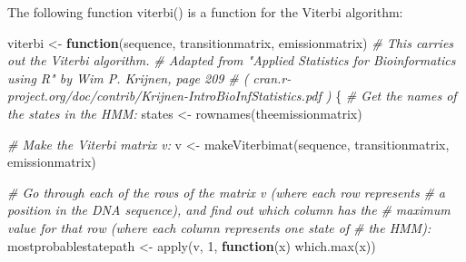 \documentclass[
]{book}
\newenvironment{Shaded}{\begin{snugshade}}{\end{snugshade}}
\newcommand{\CommentTok}[1]{\textcolor[rgb]{0.56,0.35,0.01}{\textit{#1}}}
\newcommand{\ControlFlowTok}[1]{\textcolor[rgb]{0.13,0.29,0.53}{\textbf{#1}}}
\newcommand{\DecValTok}[1]{\textcolor[rgb]{0.00,0.00,0.81}{#1}}
\newcommand{\FunctionTok}[1]{\textcolor[rgb]{0.00,0.00,0.00}{#1}}
\newcommand{\NormalTok}[1]{#1}
\newcommand{\OtherTok}[1]{\textcolor[rgb]{0.56,0.35,0.01}{#1}}
\begin{document}
The following function viterbi() is a function for the Viterbi algorithm:

\begin{Shaded}
\begin{Highlighting}[]
\NormalTok{viterbi }\OtherTok{\textless{}{-}} \ControlFlowTok{function}\NormalTok{(sequence, transitionmatrix, emissionmatrix)}
  \CommentTok{\# This carries out the Viterbi algorithm.}
  \CommentTok{\# Adapted from "Applied Statistics for Bioinformatics using R" by Wim P. Krijnen, page 209}
  \CommentTok{\# ( cran.r{-}project.org/doc/contrib/Krijnen{-}IntroBioInfStatistics.pdf )}
\NormalTok{  \{}
     \CommentTok{\# Get the names of the states in the HMM:}
\NormalTok{     states }\OtherTok{\textless{}{-}} \FunctionTok{rownames}\NormalTok{(theemissionmatrix)}

     \CommentTok{\# Make the Viterbi matrix v:}
\NormalTok{     v }\OtherTok{\textless{}{-}} \FunctionTok{makeViterbimat}\NormalTok{(sequence, transitionmatrix, emissionmatrix)}

     \CommentTok{\# Go through each of the rows of the matrix v (where each row represents}
     \CommentTok{\# a position in the DNA sequence), and find out which column has the}
     \CommentTok{\# maximum value for that row (where each column represents one state of}
     \CommentTok{\# the HMM):}
\NormalTok{     mostprobablestatepath }\OtherTok{\textless{}{-}} \FunctionTok{apply}\NormalTok{(v, }\DecValTok{1}\NormalTok{, }\ControlFlowTok{function}\NormalTok{(x) }\FunctionTok{which.max}\NormalTok{(x))}


\end{Highlighting}
\end{Shaded}
\end{document}
